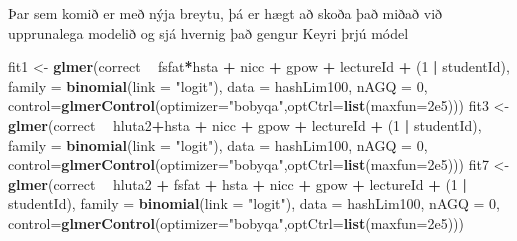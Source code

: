 \documentclass[
]{article}
\newenvironment{Shaded}{\begin{snugshade}}{\end{snugshade}}
\newcommand{\DataTypeTok}[1]{\textcolor[rgb]{0.13,0.29,0.53}{#1}}
\newcommand{\DecValTok}[1]{\textcolor[rgb]{0.00,0.00,0.81}{#1}}
\newcommand{\FloatTok}[1]{\textcolor[rgb]{0.00,0.00,0.81}{#1}}
\newcommand{\KeywordTok}[1]{\textcolor[rgb]{0.13,0.29,0.53}{\textbf{#1}}}
\newcommand{\NormalTok}[1]{#1}
\newcommand{\OperatorTok}[1]{\textcolor[rgb]{0.81,0.36,0.00}{\textbf{#1}}}
\newcommand{\StringTok}[1]{\textcolor[rgb]{0.31,0.60,0.02}{#1}}
\begin{document}
Þar sem komið er með nýja breytu, þá er hægt að skoða það miðað við upprunalega modelið og sjá hvernig það gengur
Keyri þrjú módel

\begin{Shaded}
\begin{Highlighting}[]
\NormalTok{fit1 <-}\StringTok{ }\KeywordTok{glmer}\NormalTok{(correct }\OperatorTok{~}\StringTok{ }\NormalTok{fsfat}\OperatorTok{*}\NormalTok{hsta }\OperatorTok{+}\StringTok{ }\NormalTok{nicc }\OperatorTok{+}\StringTok{ }\NormalTok{gpow }\OperatorTok{+}\StringTok{ }\NormalTok{lectureId }\OperatorTok{+}\StringTok{ }\NormalTok{(}\DecValTok{1} \OperatorTok{|}\StringTok{ }\NormalTok{studentId), }\DataTypeTok{family =} \KeywordTok{binomial}\NormalTok{(}\DataTypeTok{link =} \StringTok{"logit"}\NormalTok{), }
              \DataTypeTok{data =}\NormalTok{ hashLim100, }\DataTypeTok{nAGQ =} \DecValTok{0}\NormalTok{, }\DataTypeTok{control=}\KeywordTok{glmerControl}\NormalTok{(}\DataTypeTok{optimizer=}\StringTok{"bobyqa"}\NormalTok{,}\DataTypeTok{optCtrl=}\KeywordTok{list}\NormalTok{(}\DataTypeTok{maxfun=}\FloatTok{2e5}\NormalTok{)))}
\NormalTok{fit3 <-}\StringTok{ }\KeywordTok{glmer}\NormalTok{(correct }\OperatorTok{~}\StringTok{ }\NormalTok{hluta2}\OperatorTok{+}\NormalTok{hsta }\OperatorTok{+}\StringTok{ }\NormalTok{nicc }\OperatorTok{+}\StringTok{ }\NormalTok{gpow }\OperatorTok{+}\StringTok{ }\NormalTok{lectureId }\OperatorTok{+}\StringTok{ }\NormalTok{(}\DecValTok{1} \OperatorTok{|}\StringTok{ }\NormalTok{studentId), }\DataTypeTok{family =} \KeywordTok{binomial}\NormalTok{(}\DataTypeTok{link =} \StringTok{"logit"}\NormalTok{), }
              \DataTypeTok{data =}\NormalTok{ hashLim100, }\DataTypeTok{nAGQ =} \DecValTok{0}\NormalTok{, }\DataTypeTok{control=}\KeywordTok{glmerControl}\NormalTok{(}\DataTypeTok{optimizer=}\StringTok{"bobyqa"}\NormalTok{,}\DataTypeTok{optCtrl=}\KeywordTok{list}\NormalTok{(}\DataTypeTok{maxfun=}\FloatTok{2e5}\NormalTok{)))}
\NormalTok{fit7 <-}\StringTok{ }\KeywordTok{glmer}\NormalTok{(correct }\OperatorTok{~}\StringTok{ }\NormalTok{hluta2 }\OperatorTok{+}\StringTok{ }\NormalTok{fsfat }\OperatorTok{+}\StringTok{ }\NormalTok{hsta }\OperatorTok{+}\StringTok{ }\NormalTok{nicc }\OperatorTok{+}\StringTok{ }\NormalTok{gpow }\OperatorTok{+}\StringTok{ }\NormalTok{lectureId }\OperatorTok{+}\StringTok{ }\NormalTok{(}\DecValTok{1} \OperatorTok{|}\StringTok{ }\NormalTok{studentId), }\DataTypeTok{family =} \KeywordTok{binomial}\NormalTok{(}\DataTypeTok{link =} \StringTok{"logit"}\NormalTok{), }
              \DataTypeTok{data =}\NormalTok{ hashLim100, }\DataTypeTok{nAGQ =} \DecValTok{0}\NormalTok{, }\DataTypeTok{control=}\KeywordTok{glmerControl}\NormalTok{(}\DataTypeTok{optimizer=}\StringTok{"bobyqa"}\NormalTok{,}\DataTypeTok{optCtrl=}\KeywordTok{list}\NormalTok{(}\DataTypeTok{maxfun=}\FloatTok{2e5}\NormalTok{)))}
\end{Highlighting}
\end{Shaded}
\end{document}
